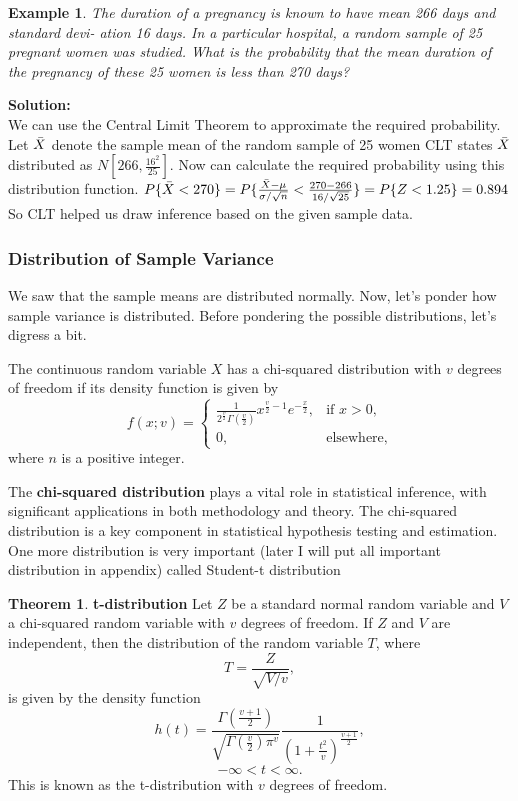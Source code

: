 \documentclass[12pt,a4paper]{article}
\theoremstyle{example}
\newtheorem{example}{Example}
\theoremstyle{definition}
\theoremstyle{theorem}
\newtheorem{theorem}{Theorem}
\begin{document}
\begin{example}
      The duration of a pregnancy is known to have mean 266 days and standard devi-
ation 16 days. In a particular hospital, a random sample of 25 pregnant women
was studied. What is the probability that the mean duration of the pregnancy of
these 25 women is less than 270 days?
\end{example}

\textbf{Solution: }\\We can use the Central Limit Theorem to approximate the required
   probability. Let $\Bar{X}$ denote the sample mean of the random sample of 25 women CLT states $\Bar{X}$ distributed as $N[266, \frac{16^2}{25}]$. Now can calculate the required probability using this distribution function.
   $P\{\Bar{X}<270\}=P\{\frac{\Bar{X}-\mu}{\sigma/\sqrt{n}}<\frac{270-266}{16/\sqrt{25}}\}=P\{Z<1.25\}=0.894$ \\
   So CLT helped us draw inference based on the given sample data.
   
\subsubsection{Distribution of Sample Variance }
We saw that the sample means are distributed normally. Now, let's ponder how sample variance is distributed. Before pondering the possible distributions, let's digress a bit.



The continuous random variable \(X\) has a chi-squared distribution with \(v\) degrees of freedom if its density function is given by
\[
f(x; v) =
\begin{cases}
    \frac{1}{2^{\frac{v}{2}} \Gamma\left(\frac{v}{2}\right)} x^{\frac{v}{2} - 1} e^{-\frac{x}{2}}, & \text{if } x > 0, \\
    0, & \text{elsewhere},
\end{cases}
\]
where \(n\) is a positive integer.

The \textbf{chi-squared distribution} plays a vital role in statistical inference, with significant applications in both methodology and theory. The chi-squared distribution is a key component in statistical hypothesis testing and estimation.
One more distribution is very important (later I will put all important distribution in appendix) called Student-t distribution \citep{walpole1993probability}
\begin{theorem}\textbf{t-distribution}
    Let \(Z\) be a standard normal random variable and \(V\) a chi-squared random variable with \(v\) degrees of freedom. If \(Z\) and \(V\) are independent, then the distribution of the random variable \(T\), where
\[
T = \frac{Z}{\sqrt{V/v}},
\]
is given by the density function
\[
h(t) = \frac{\Gamma\left(\frac{v + 1}{2}\right)}{\sqrt{\Gamma\left(\frac{v}{2}\right)\pi^v}} \frac{1}{\left(1 + \frac{t^2}{v}\right)^{\frac{v+1}{2}}},
\]
\[
-\infty < t < \infty.
\]
This is known as the t-distribution with \(v\) degrees of freedom.
\label{t-dis}
\end{theorem}
\end{document}
